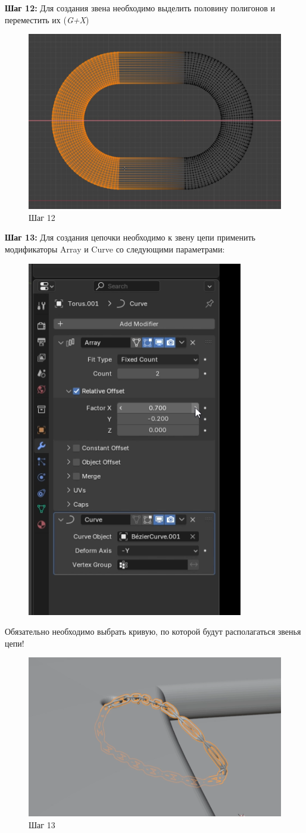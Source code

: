 \documentclass[areasetadvanced]{scrartcl}
\begin{document}
\par \textbf{Шаг 12:} Для создания звена необходимо выделить половину полигонов и переместить их (\textit{G+X})

\begin{figure}[H]
    \label{4} 
    \centering
    \includegraphics[width=0.8\linewidth]{dino/12.png}
    \caption{Шаг 12}
\end{figure}


\par \textbf{Шаг 13:} Для создания цепочки необходимо к звену цепи применить модификаторы Array и Curve со следующими параметрами:

\begin{figure}[H]
    \label{4} 
    \centering
    \includegraphics[width=0.4\linewidth]{dino/13.2.png}
\end{figure}
Обязательно необходимо выбрать кривую, по которой будут располагаться звенья цепи!
\begin{figure}[H]
    \label{4} 
    \centering
    \includegraphics[width=0.8\linewidth]{dino/13.png}
    \caption{Шаг 13}
\end{figure}
\end{document}
